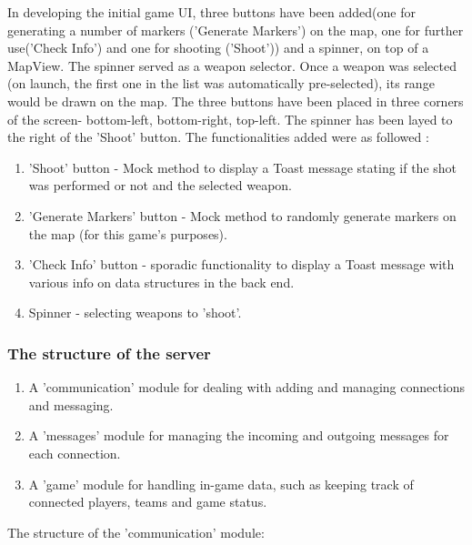 In developing the initial game UI, three buttons have been added(one for
generating a number of markers ('Generate Markers') on the map, one for further
use('Check Info') and one for shooting ('Shoot')) and a spinner, on top of a
MapView. The spinner served as a weapon selector. Once a weapon was selected (on
launch, the first one in the list was automatically pre-selected), its range
would be drawn on the map. The three buttons have been placed in three corners
of the screen- bottom-left, bottom-right, top-left. The spinner has been layed
to the right of the 'Shoot' button. The functionalities added were as followed :

\begin{enumerate}
  \item 'Shoot' button - Mock method to display a Toast message stating if the
  shot was performed or not and the selected weapon.
  
  \item 'Generate Markers' button - Mock method to randomly generate markers on
  the map (for this game's purposes).
  
  \item 'Check Info' button - sporadic functionality to display a Toast message
  with various info on data structures in the back end.
  
  \item Spinner - selecting weapons to 'shoot'. 
\end{enumerate}


\subsubsection{The structure of the server}
 
\begin{enumerate}
  
  \item A 'communication' module for dealing with adding and managing
  connections and messaging.
  
  \item A 'messages' module for managing the incoming and outgoing messages for
  each connection.
  
  \item A 'game' module for handling in-game data, such as keeping track of
  connected players, teams and game status. 
  
\end{enumerate}

The structure of the 'communication' module:


